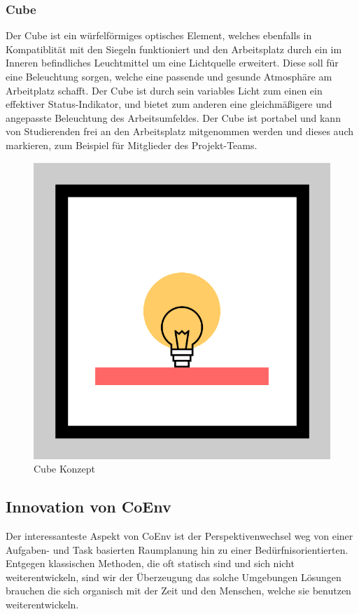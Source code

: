 \documentclass{article}
\begin{document}
\subsubsection*{Cube}
Der Cube ist ein würfelförmiges optisches Element, welches ebenfalls in Kompatiblität mit den Siegeln funktioniert und den Arbeitsplatz durch ein im Inneren befindliches Leuchtmittel um eine Lichtquelle erweitert. Diese soll für eine Beleuchtung sorgen, welche eine passende und gesunde Atmosphäre am Arbeitplatz schafft. Der Cube ist durch sein variables Licht zum einen ein effektiver Status-Indikator, und bietet zum anderen eine gleichmäßigere und angepasste Beleuchtung des Arbeitsumfeldes. Der Cube ist portabel und kann von Studierenden frei an den Arbeitsplatz mitgenommen werden und dieses auch markieren, zum Beispiel für Mitglieder des Projekt-Teams.
\begin{figure}[h]
  \centering
  \includegraphics[width=.7\linewidth]{images/cube-concept.png}
  \caption{Cube Konzept}
  \label{fig:sub1}
\end{figure}

\subsection{Innovation von CoEnv}

Der interessanteste Aspekt von CoEnv ist der Perspektivenwechsel weg von einer Aufgaben- und Task basierten Raumplanung hin zu einer Bedürfnisorientierten. Entgegen klassischen Methoden, die oft statisch sind und sich nicht weiterentwickeln, sind wir der Überzeugung das solche Umgebungen Lösungen brauchen die sich organisch mit der Zeit und den Menschen, welche sie benutzen weiterentwickeln. 
\end{document}
